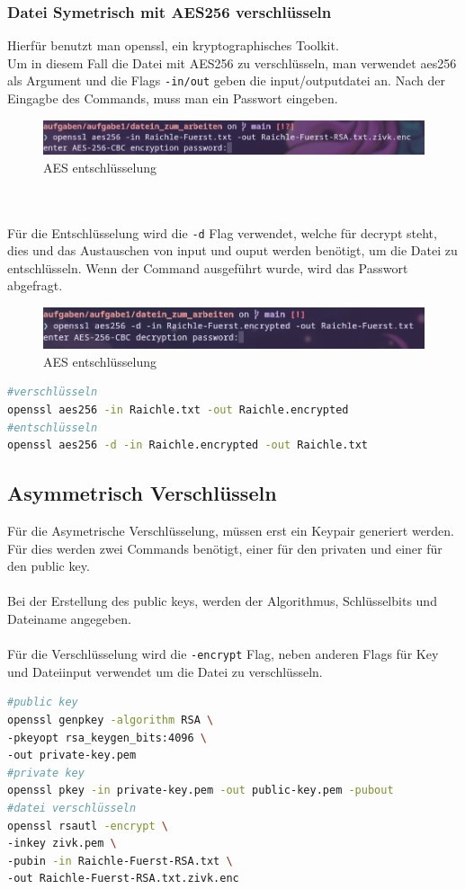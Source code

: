 \documentclass[a4paper]{article}
\begin{document}
\subsubsection{Datei Symetrisch mit AES256 verschlüsseln}
Hierfür benutzt man openssl, ein kryptographisches Toolkit.\cite{openssl-cheatsh}\\
Um in diesem Fall die Datei mit AES256 zu verschlüsseln, man verwendet aes256 als Argument und die Flags \texttt{-in/out} geben die input/outputdatei an. Nach der Eingagbe des Commands, muss man ein Passwort eingeben.
\begin{figure}[h]
	\centering
	\includegraphics[scale=1.5]{images/aes-encrypt.png}
	\caption{AES entschlüsselung}
\end{figure} \\ \\
Für die Entschlüsselung wird die \texttt{-d} Flag verwendet, welche für decrypt steht, dies und das Austauschen von input und ouput werden benötigt, um die Datei zu entschlüsseln. Wenn der Command ausgeführt wurde, wird das Passwort abgefragt.
\begin{figure}[h]
	\centering
	\includegraphics[scale=1.5]{images/aes-decrypt.png}
	\caption{AES entschlüsselung}
\end{figure}
\begin{lstlisting}[language=bash]
#verschlüsseln
openssl aes256 -in Raichle.txt -out Raichle.encrypted
#entschlüsseln
openssl aes256 -d -in Raichle.encrypted -out Raichle.txt
\end{lstlisting}
\newpage
\subsection{Asymmetrisch Verschlüsseln}
Für die Asymetrische Verschlüsselung, müssen erst ein Keypair generiert werden. Für dies werden zwei Commands benötigt, einer für den privaten und einer für den public key. \\ \\
Bei der Erstellung des public keys, werden der Algorithmus, Schlüsselbits und Dateiname angegeben. \\ \\
Für die Verschlüsselung wird die \texttt{-encrypt} Flag, neben anderen Flags für Key und Dateiinput verwendet um die Datei zu verschlüsseln.
\begin{lstlisting}[language=bash]
#public key
openssl genpkey -algorithm RSA \ 
-pkeyopt rsa_keygen_bits:4096 \
-out private-key.pem
#private key
openssl pkey -in private-key.pem -out public-key.pem -pubout
#datei verschlüsseln
openssl rsautl -encrypt \
-inkey zivk.pem \
-pubin -in Raichle-Fuerst-RSA.txt \
-out Raichle-Fuerst-RSA.txt.zivk.enc
\end{lstlisting}
\end{document}
